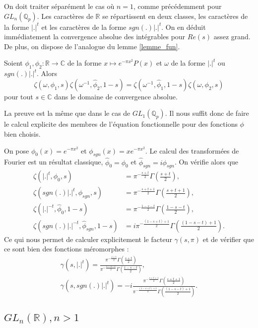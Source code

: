 On doit traiter séparément le cas où $n=1$, comme précédemment pour $GL_n(\mathbb{Q}_p)$. Les caractères de $\mathbb{R}$ se répartissent en deux classes, les caractères de la forme $|.|^t$ et les caractères de la forme $sgn(.)|.|^t$. On en déduit immédiatement la convergence absolue des intégrables pour $Re(s)$ assez grand. De plus, on dispose de l'analogue du lemme \ref{lemme_fun}.
\begin{lemme}
Soient $\phi_1, \phi_2 : \mathbb{R} \rightarrow \mathbb{C}$ de la forme $x \mapsto e^{-\pi x^2}P(x)$ et $\omega$ de la forme $|.|^t$ ou $sgn(.)|.|^t$. Alors
\begin{equation}
\zeta(\omega, \phi_1, s)\zeta(\omega^{-1}, \hat{\phi}_2, 1-s)=\zeta(\omega^{-1}, \hat{\phi}_1, 1-s)\zeta(\omega, \phi_2, s)
\end{equation}
pour tout $s \in \mathbb{C}$ dans le domaine de convergence absolue.
\end{lemme}
La preuve est la même que dans le cas de $GL_1(\mathbb{Q}_p)$. Il nous suffit donc de faire le calcul explicite des membres de l'équation fonctionnelle pour des fonctions $\phi$ bien choisis.

On pose $\phi_0(x) = e^{-\pi x^2}$ et $\phi_{sgn}(x)=xe^{-\pi x^2}$. Le calcul des transformées de Fourier est un résultat classique, $\hat{\phi}_0 = \phi_0$ et $\hat{\phi}_{sgn} = i\phi_{sgn}$. On vérifie alors que
\begin{align}
\zeta(|.|^t, \phi_0, s) &= \pi^{-\frac{s+t}{2}}\Gamma(\frac{s+t}{2}), \\
\zeta(sgn(.)|.|^t, \phi_{sgn}, s) &= \pi^{-\frac{s+t+1}{2}}\Gamma(\frac{s+t+1}{2}), \\
\zeta(|.|^{-t}, \hat{\phi}_0, 1-s) &= \pi^{-\frac{1-s-t}{2}}\Gamma(\frac{1-s-t}{2}), \\
\zeta(sgn(.)|.|^{-t}, \hat{\phi}_{sgn}, 1-s) &= i\pi^{-\frac{(1-s+t)+1}{2}}\Gamma(\frac{(1-s-t)+1}{2}).
\end{align}
Ce qui nous permet de calculer explicitement le facteur $\gamma(s,\pi)$ et de vérifier que ce sont bien des fonctions méromorphes :
\begin{align}
\gamma(s, |.|^t) = \frac{\pi^{-\frac{s+t}{2}}\Gamma(\frac{s+t}{2})}{\pi^{-\frac{1-s-t}{2}}\Gamma(\frac{1-s-t}{2})}, \\
\gamma(s, sgn(.)|.|^t) = -i\frac{\pi^{-\frac{s+t+1}{2}}\Gamma(\frac{s+t+1}{2})}{\pi^{-\frac{(1-s+t)+1}{2}}\Gamma(\frac{(1-s-t)+1}{2})}.
\end{align}

\subsection{$GL_n(\mathbb{R}), n > 1$}

